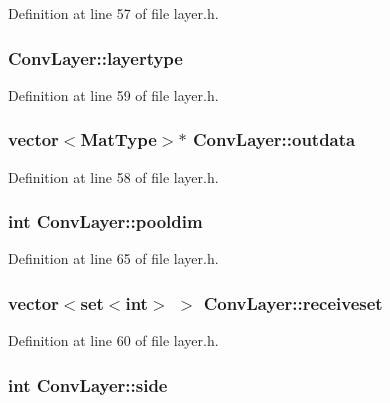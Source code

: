 Definition at line 57 of file layer.\+h.

\hypertarget{class_conv_layer_abb72df40265f9b3c7667318a8e3014c0}{
\subsubsection[{layertype}]{ Conv\+Layer\+::layertype}}\label{class_conv_layer_abb72df40265f9b3c7667318a8e3014c0}


Definition at line 59 of file layer.\+h.

\hypertarget{class_conv_layer_afee4ff21cc91013563dd16a4a617f934}{
\subsubsection[{outdata}]{\setlength{\rightskip}{0pt plus 5cm}vector$<${\bf Mat\+Type}$>$$\ast$ Conv\+Layer\+::outdata}}\label{class_conv_layer_afee4ff21cc91013563dd16a4a617f934}


Definition at line 58 of file layer.\+h.

\hypertarget{class_conv_layer_a1b3fb2e086eee6768b79a260f2035ee8}{
\subsubsection[{pooldim}]{\setlength{\rightskip}{0pt plus 5cm}int Conv\+Layer\+::pooldim}}\label{class_conv_layer_a1b3fb2e086eee6768b79a260f2035ee8}


Definition at line 65 of file layer.\+h.

\hypertarget{class_conv_layer_a611e9895011c49713221b074abfc521f}{
\subsubsection[{receiveset}]{\setlength{\rightskip}{0pt plus 5cm}vector$<$set$<$int$>$ $>$ Conv\+Layer\+::receiveset}}\label{class_conv_layer_a611e9895011c49713221b074abfc521f}


Definition at line 60 of file layer.\+h.

\hypertarget{class_conv_layer_a941ec7552673506cbb7580e41e982494}{
\subsubsection[{side}]{\setlength{\rightskip}{0pt plus 5cm}int Conv\+Layer\+::side}}\label{class_conv_layer_a941ec7552673506cbb7580e41e982494}


